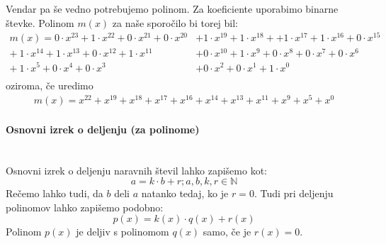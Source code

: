\documentclass[12pt]{article}
\begin{document}
            Vendar pa še vedno potrebujemo polinom. Za koeficiente uporabimo
            binarne števke. Polinom $m(x)$ za naše sporočilo bi torej bil:
            \begin{equation}
                \begin{split}
                    m(x) = 0 \cdot x^{23} + 1 \cdot x^{22} + 0 \cdot x^{21}
                    + 0 \cdot x^{20} & + 1 \cdot x^{19} + 1 \cdot x^{18} +
                    + 1 \cdot x^{17} + 1 \cdot x^{16} + 0 \cdot x^{15}\\
                    + \: 1 \cdot x^{14} + 1 \cdot x^{13} + 0 \cdot x^{12}
                    + 1 \cdot x^{11} & + 0  \cdot x^{10} + 1 \cdot x^{9}
                    + 0 \cdot x^{8} + 0 \cdot x^{7} + 0 \cdot x^{6} \\
                    + \:1 \cdot x^{5} + 0 \cdot x^{4} + 0 \cdot x^{3} &
                    + 0 \cdot x^{2} + 0 \cdot x^{1} + 1 \cdot x^{0}\\
                \end{split}
            \end{equation}
            oziroma, če uredimo
            \begin{equation}
                \begin{split}
                    m(x) = x^{22} + x^{19} + x^{18} + x^{17} + x^{16} +
                    x^{14} + x^{13} + x^{11} + x^{9} + x^{5} + x^{0}
                \end{split}
            \end{equation}
        \paragraph*{Osnovni izrek o deljenju (za polinome)} \mbox{}\\
            Osnovni izrek o deljenju naravnih števil lahko zapišemo kot:
            \begin{equation}
                a = k \cdot b + r; a,b,k,r \in \mathbb{N}
            \end{equation}
            Rečemo lahko tudi, da $b$ deli $a$ natanko tedaj, ko je $r=0$.
            Tudi pri deljenju polinomov lahko zapišemo podobno:
            \begin{equation}
                p(x) = k(x) \cdot q(x) + r(x)
            \end{equation}
            Polinom $p(x)$ je deljiv s polinomom $q(x)$ samo, če je
            $r(x)=0$.
\end{document}
